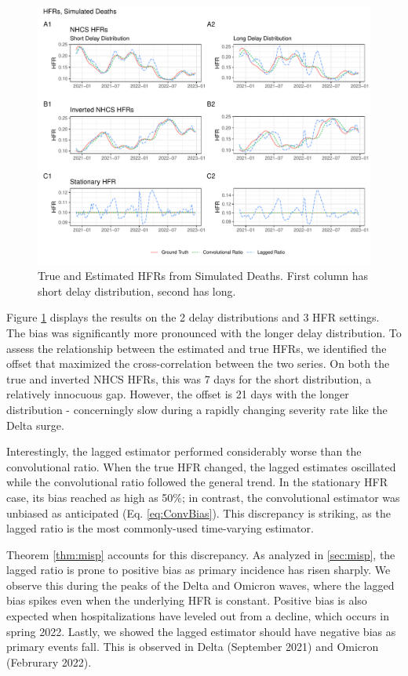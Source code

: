 \documentclass{article}
\begin{document}
\begin{figure}
    \centering
    \includegraphics[width=\linewidth]{Figs/Simulated/simulated_results.pdf}
    \caption{True and Estimated HFRs from Simulated Deaths. First column has short delay distribution, second has long.}
    \label{fig:sims}
\end{figure}

Figure \ref{fig:sims} displays the results on the 2 delay distributions and 3 HFR settings. The bias was significantly more pronounced with the longer delay distribution. To assess the relationship between the estimated and true HFRs, we identified the offset that maximized the cross-correlation between the two series. On both the true and inverted NHCS HFRs, this was 7 days for the short distribution, a relatively innocuous gap. However, the offset is 21 days with the longer distribution - concerningly slow during a rapidly changing severity rate like the Delta surge.

Interestingly, the lagged estimator performed considerably worse than the convolutional ratio. When the true HFR changed, the lagged estimates oscillated while the convolutional ratio followed the general trend. In the stationary HFR case, its bias reached as high as 50\%; in contrast, the convolutional estimator was unbiased as anticipated (Eq. \ref{eq:ConvBias}). This discrepancy is striking, as the lagged ratio is the most commonly-used time-varying estimator. 

Theorem \ref{thm:misp} accounts for this discrepancy. As analyzed in \ref{sec:misp}, the lagged ratio is prone to positive bias as primary incidence has risen sharply. We observe this during the peaks of the Delta and Omicron waves, where the lagged bias spikes even when the underlying HFR is constant. Positive bias is also expected when hospitalizations have leveled out from a decline, which occurs in spring 2022. Lastly, we showed the lagged estimator should have negative bias as primary events fall. This is observed in Delta (September 2021) and Omicron (Februrary 2022). 
\end{document}
